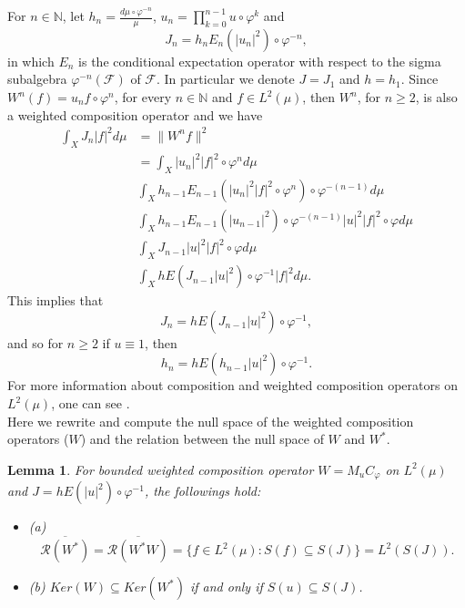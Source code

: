 \documentclass{amsart}
\newtheorem{lem}[thm]{Lemma}
\theoremstyle{definition}\newtheorem{defn}[thm]{Definition}
\theoremstyle{remark}
\numberwithin{equation}{section}
\begin{document}
For $n\in \mathbb{N}$, let $h_n=\frac{d\mu\circ\varphi^{-n}}{\mu}$, $u_n=\prod^{n-1}_{k=0}u\circ\varphi^k$ and 
$$J_n=h_nE_n(|u_n|^2)\circ\varphi^{-n},$$
in which $E_n$ is the conditional expectation operator with respect to the sigma subalgebra $\varphi^{-n}(\mathcal{F})$ of $\mathcal{F}$. In particular we denote $J=J_1$ and $h=h_1$. Since $W^n(f)=u_nf\circ\varphi^n$, for every $n\in\mathbb{N}$ and $f\in L^2(\mu)$, then $W^n$, for $n\geq 2$, is also a weighted composition operator and we have 
\begin{align*}
\int_XJ_n|f|^2d\mu&=\|W^nf\|^2\\
&=\int_X|u_n|^2|f|^2\circ\varphi^nd\mu\\
&\int_Xh_{n-1}E_{n-1}(|u_n|^2|f|^2\circ\varphi^n)\circ\varphi^{-(n-1)}d\mu\\
&\int_Xh_{n-1}E_{n-1}(|u_{n-1}|^2)\circ\varphi^{-(n-1)}|u|^2|f|^2\circ\varphi d\mu\\
&\int_XJ_{n-1}|u|^2|f|^2\circ\varphi d\mu\\
&\int_XhE(J_{n-1}|u|^2)\circ\varphi^{-1}|f|^2d\mu.
\end{align*}
 This implies that
  $$J_n=hE(J_{n-1}|u|^2)\circ\varphi^{-1},$$
 and so for $n\geq 2$ if $u\equiv 1$, then 
 $$h_n=hE(h_{n-1}|u|^2)\circ\varphi^{-1}.$$ For more information about composition and weighted composition operators on $L^2(\mu)$, one can see \cite{bbl, cj}.\\
 Here we rewrite and compute the null space of the weighted composition operators ($W$) and the relation between the null space of $W$ and $W^*$. \cite{bbl, lam}
 \begin{lem}\label{l1.1}
For bounded weighted composition operator $W=M_uC_{\varphi}$ on $L^2(\mu)$ and $J=hE(|u|^2)\circ\varphi^{-1}$, the followings hold:
\begin{itemize}
\item (a) $$\overline{\mathcal{R}(W^*)}=\overline{\mathcal{R}(W^*W)}=\{f\in L^2(\mu): S(f)\subseteq S(J)\}=L^2(S(J)).$$
\item (b) $Ker(W)\subseteq Ker(W^*)$ if and only if $S(u)\subseteq S(J)$. 
\end{itemize}
 \end{lem}
\end{document}
